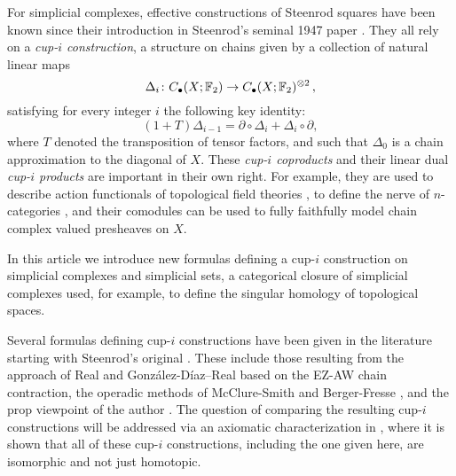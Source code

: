 For simplicial complexes, effective constructions of Steenrod squares have been known since their introduction in Steenrod's seminal 1947 paper \cite{steenrod1947products}.
They all rely on a \textit{cup-$i$ construction}, a structure on chains given by a collection of natural linear maps
\begin{equation*}
\Delta_i \colon C_\bullet(X; {\mathbb{F}_2})  \to C_\bullet(X; {\mathbb{F}_2})^{\otimes 2}\,,
\end{equation*}
satisfying for every integer $i$ the following key identity:
\begin{equation*}
(1+T) \Delta_{i-1} =
\partial \circ \Delta_i + \Delta_i \circ \partial,
\end{equation*}
where $T$ denoted the transposition of tensor factors,
and such that $\Delta_0$ is a chain approximation to the diagonal of $X$.
These \textit{cup-$i$ coproducts} and their linear dual \textit{cup-$i$ products} are important in their own right.
For example, they are used to describe action functionals of topological field theories \cite{gaiotto2016spin,kapustin2017fermionic,barkeshli2021classification}, to define the nerve of $n$-categories \cite{medina2020globular}, and their comodules can be used to fully faithfully model chain complex valued presheaves \cite{medina2022assembly} on $X$.

In this article we introduce new formulas defining a cup-$i$ construction on simplicial complexes and simplicial sets, a categorical closure of simplicial complexes used, for example, to define the singular homology of topological spaces.

Several formulas defining cup-$i$ constructions have been given in the literature starting with Steenrod's original \cite{steenrod1947products}.
These include those resulting from the approach of Real \cite{real1996computability} and Gonz\'alez-D\'iaz--Real \cite{gonzalez-diaz1999steenrod, gonzalez2003computation, gonzalez-diaz2005cocyclic} based on the EZ-AW chain contraction, the operadic methods of McClure-Smith \cite{mcclure2003multivariable} and Berger-Fresse \cite{berger2004combinatorial}, and the prop viewpoint of the author \cite{medina2020prop1, medina2021prop2}.
The question of comparing the resulting cup-$i$ constructions will be addressed via an axiomatic characterization in \cite{medina2022axiomatic}, where it is shown that all of these cup-$i$ constructions, including the one given here, are isomorphic and not just homotopic.

